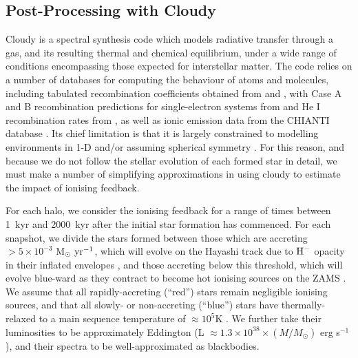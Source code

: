 \documentclass[graphics, twocolumn, usenatbib]{mn2e}
\newcommand{\msolaryrc} {$\rm{M_{\odot}~yr^{-1}}$}
\begin{document}
\subsection{Post-Processing with Cloudy}
\label{cloudy:description}
      {\sc Cloudy} \citep{Ferland_2017} is a spectral synthesis code which models radiative transfer
      through a gas, and its resulting thermal and chemical equilibrium, under a wide range of conditions
      encompassing those expected for interstellar matter. %
      The code relies on a number of databases for computing the behaviour of atoms and molecules,
      including tabulated recombination coefficients obtained from \cite{Badnell_2003}
      and \cite{Badnell_2006}, with Case A and B recombination predictions for single-electron
      systems from \cite{Storey_1995} and He I recombination rates from \cite{Porter_2012},
      as well as ionic emission data from the CHIANTI database \citep{Dere_1997,Dere_2012}.
      Its chief limitation is that it is largely constrained to modelling environments in 1-D
      and/or assuming spherical symmetry \citep[though see, e.g.,][for recent efforts to extend
        its implementation to pseudo-3D problems]{Morisset_2013, Fitzgerald_2020}. For this
      reason, and because we do not follow the stellar evolution of each formed star in detail,
      we must make a number of simplifying approximations in using {\sc cloudy} to estimate
      the impact of ionising feedback. 

For each halo, we consider the ionising feedback for a range of times between 1~kyr and 2000~kyr
after the initial star formation has commenced. For each snapshot, we divide the stars formed between
those which are accreting $> 5 \times 10^{-3}$ \msolaryrc, which will evolve on the Hayashi track due
to $\rm{H}^{-}$ opacity in their inflated envelopes \citep[e.g.,][]{Hosokawa_2013}, and those accreting
below this threshold, which will evolve blue-ward as they contract to become hot ionising sources on
the ZAMS \citep{Haemmerle_2017}. We assume that all rapidly-accreting (``red'') stars remain negligible
ionising sources, and that all slowly- or non-accreting (``blue'') stars have thermally-relaxed to a
main sequence temperature of $\approx 10^{5}$K \citep{Schaerer_2002, Woods_2020}. We further take
their luminosities to be approximately Eddington (L $\approx 1.3\times 10^{38} \times (M/M_{\odot})$
erg s$^{-1}$), and their spectra to be well-approximated as blackbodies.
\end{document}
